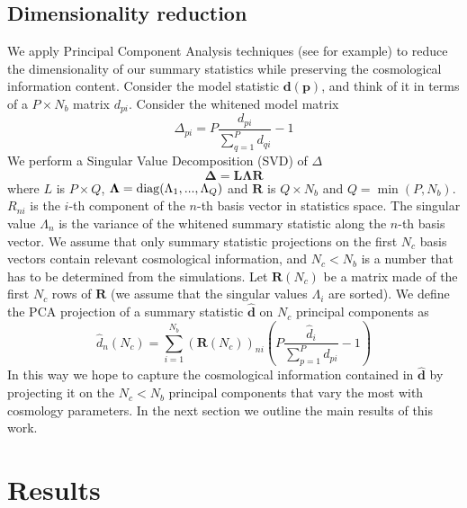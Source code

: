 \documentclass[reprint,aps,prd,superscriptaddress,showkeys,showpacs]{revtex4-1}
\newcommand{\bb}[1]{\mathbf{#1}}
\newcommand{\bbh}[1]{\mathbf{\hat{#1}}}
\newcommand{\h}[1]{\hat{#1}}
\begin{document}
\subsection{Dimensionality reduction}
We apply Principal Component Analysis techniques (see \citep{astroMLText} for example) to reduce the dimensionality of our summary statistics while preserving the cosmological information content. Consider the model statistic $\bb{d}(\bb{p})$, and think of it in terms of a $P\times N_b$ matrix $d_{pi}$. Consider the whitened model matrix
\begin{equation}
\Delta_{pi} = P\frac{d_{pi}}{\sum_{q=1}^Pd_{qi}} - 1
\end{equation} 
%
We perform a Singular Value Decomposition (SVD) of $\Delta$ 
\begin{equation}
\bb\Delta = \bb{L}\bb{\Lambda} \bb{R}
\end{equation}
%
where $L$ is $P\times Q$, $\bb{\Lambda}={\rm diag}(\Lambda_1,...,\Lambda_Q)$ and $\bb{R}$ is $Q\times N_b$ and $Q={\min}(P,N_b)$. $R_{ni}$ is the $i$-th component of the $n$-th basis vector in statistics space. The singular value $\Lambda_n$ is the variance of the whitened summary statistic along the $n$-th basis vector. We assume that only summary statistic projections on the first $N_c$ basis vectors contain relevant cosmological information, and $N_c<N_b$ is a number that has to be determined from the simulations. Let $\bb{R}(N_c)$ be a matrix made of the first $N_c$ rows of $\bb{R}$ (we assume that the singular values $\Lambda_i$ are sorted). We define the PCA projection of a summary statistic $\bbh{d}$ on $N_c$ principal components as 
\begin{equation}
\label{meth:pcaprojection}
\h{d}_n(N_c) = \sum_{i=1}^{N_b}(\bb{R}(N_c))_{ni}\left(P\frac{\h{d}_i}{\sum_{p=1}^P d_{pi}}-1\right) 
\end{equation} 
%
In this way we hope to capture the cosmological information contained in $\bbh{d}$ by projecting it on the $N_c<N_b$ principal components that vary the most with cosmology parameters. In the next section we outline the main results of this work.  

\section{Results}
\end{document}
